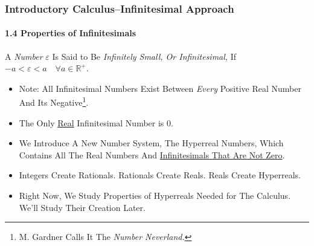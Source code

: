 \begin{frame}
\frametitle{Introductory Calculus--Infinitesimal Approach}
\framesubtitle{1.4 Properties of Infinitesimals}
\label{slide:1.4-05}
\begin{definition}
A \textit{Number} $\varepsilon$ Is Said to Be \textit{Infinitely Small, Or Infinitesimal,} If $-a<\varepsilon<a \quad\forall a\in\mathbb{R}^+$.
\end{definition}
\begin{itemize}
\item Note: All Infinitesimal Numbers Exist Between \textit{Every} Positive Real Number And Its Negative\footnote{M. Gardner Calls It The \textit{Number Neverland.}}.
\pause\item The \alert{Only \underline{Real} Infinitesimal Number is $0$}.
\pause\item We Introduce A New Number System, \alert{The Hyperreal Numbers}, Which \alert{Contains All The Real Numbers And \underline{Infinitesimals That Are Not Zero}}.
\pause\item \alert{Integers Create Rationals. Rationals Create Reals. Reals Create Hyperreals.}
\pause\item Right Now, \alert{We Study Properties of Hyperreals Needed for The Calculus}. We'll Study Their Creation Later.
\end{itemize}
\end{frame}
